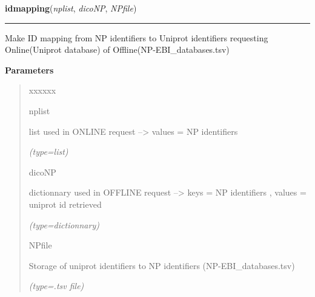 \hspace{.8\funcindent}\begin{boxedminipage}{\funcwidth}

    \raggedright \textbf{idmapping}(\textit{nplist}, \textit{dicoNP}, \textit{NPfile})

    \vspace{-1.5ex}

    \rule{\textwidth}{0.5\fboxrule}
\setlength{\parskip}{2ex}
    Make ID mapping from NP identifiers to Uniprot identifiers requesting 
    Online(Uniprot database) of Offline(NP-EBI\_databases.tsv)

\setlength{\parskip}{1ex}
      \textbf{Parameters}
      \vspace{-1ex}

      \begin{quote}
        \begin{Ventry}{xxxxxx}

          \item[nplist]

          list used in ONLINE request --{\textgreater} values = NP 
          identifiers

            {\it (type=list)}

          \item[dicoNP]

          dictionnary used in OFFLINE request --{\textgreater} keys = NP 
          identifiers , values = uniprot id retrieved

            {\it (type=dictionnary)}

          \item[NPfile]

          Storage of uniprot identifiers to NP identifiers 
          (NP-EBI\_databases.tsv)

            {\it (type=.tsv file)}

        \end{Ventry}

      \end{quote}

    \end{boxedminipage}

    \label{GoXML:UNIPROTtoGO}

    \vspace{0.5ex}

